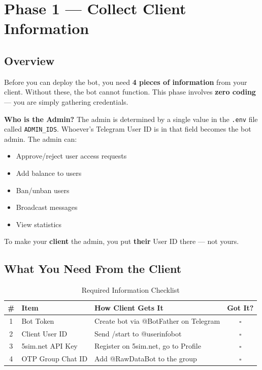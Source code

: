 
\chapter{Phase 1 --- Collect Client Information}

\section{Overview}

Before you can deploy the bot, you need \textbf{4 pieces of information} from your client. Without these, the bot cannot function. This phase involves \textbf{zero coding} --- you are simply gathering credentials.

\begin{infobox}
\textbf{Who is the Admin?} The admin is determined by a single value in the \texttt{.env} file called \texttt{ADMIN\_IDS}. Whoever's Telegram User ID is in that field becomes the bot admin. The admin can:
\begin{itemize}
    \item Approve/reject user access requests
    \item Add balance to users
    \item Ban/unban users
    \item Broadcast messages
    \item View statistics
\end{itemize}
To make your \textbf{client} the admin, you put \textbf{their} User ID there --- not yours.
\end{infobox}

\section{What You Need From the Client}

\begin{table}[H]
\centering
\caption{Required Information Checklist}
\begin{tabularx}{\textwidth}{|c|l|X|c|}
\hline
\textbf{\#} & \textbf{Item} & \textbf{How Client Gets It} & \textbf{Got It?} \\
\hline
1 & Bot Token & Create bot via @BotFather on Telegram & $\square$ \\
\hline
2 & Client User ID & Send /start to @userinfobot & $\square$ \\
\hline
3 & 5sim.net API Key & Register on 5sim.net, go to Profile & $\square$ \\
\hline
4 & OTP Group Chat ID & Add @RawDataBot to the group & $\square$ \\
\hline
\end{tabularx}
\end{table}

